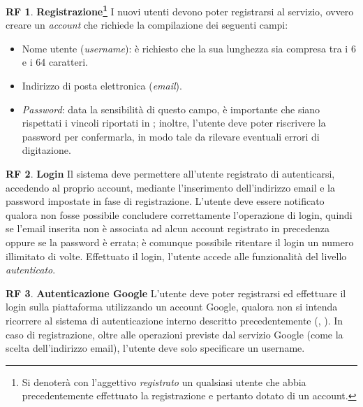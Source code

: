 \documentclass[11pt, a4paper]{article}
\theoremstyle{definition}
\newtheorem{funcreq}{RF} %
\begin{document}
\begin{funcreq}
\label{signup}
\textbf{Registrazione\footnote{Si denoterà con l'aggettivo \textit{registrato} un qualsiasi
utente che abbia precedentemente effettuato la registrazione e pertanto dotato di un account.} }
I nuovi utenti devono poter registrarsi al servizio, ovvero creare un \textit{account} che
richiede la compilazione dei seguenti campi:
\begin{itemize}
    \item Nome utente (\textit{username}): è richiesto che la sua lunghezza sia
    compresa tra i 6 e i 64 caratteri.
    \item Indirizzo di posta elettronica (\textit{email}).
    \item \textit{Password}: data la sensibilità di questo campo, è importante
    che siano rispettati i vincoli riportati in \textcolor{blue}{};
    inoltre, l'utente deve poter riscrivere la password per confermarla, in
    modo tale da rilevare eventuali errori di digitazione.
\end{itemize}
\end{funcreq}

\begin{funcreq}
\label{login}
\textbf{Login }
Il sistema deve permettere all'utente registrato di autenticarsi,
accedendo al proprio account, mediante l'inserimento dell'indirizzo
email e la password impostate in fase di registrazione. L'utente deve
essere notificato qualora non fosse possibile concludere correttamente
l'operazione di login, quindi se l'email inserita non è associata ad alcun
account registrato in precedenza oppure se la password è errata;
è comunque possibile ritentare il login un numero illimitato di volte.
Effettuato il login, l'utente accede alle funzionalità del livello \textit{autenticato}.
\end{funcreq}

\begin{funcreq}
\label{google}
\textbf{Autenticazione Google }
L'utente deve poter registrarsi ed effettuare il login sulla piattaforma
utilizzando un account Google, qualora non si intenda ricorrere al sistema di
autenticazione interno descritto precedentemente (\textcolor{blue}{}, \textcolor{blue}{}).
In caso di registrazione, oltre alle operazioni previste dal servizio Google
(come la scelta dell'indirizzo email), l'utente deve solo specificare un username.
\end{funcreq}
\end{document}
